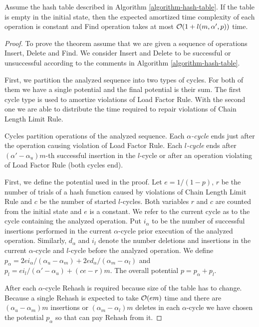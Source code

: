 \begin{theorem}
\label{theorem-amortised-expected-time}
Assume the hash table described in Algorithm \ref{algorithm-hash-table}. 
If the table is empty in the initial state, then the expected amortized time complexity of each operation is constant and Find operation takes at most $\mathcal{O}(1 + l(m, \alpha', p))$ time.
\end{theorem}
\begin{proof}
To prove the theorem assume that we are given a sequence of operations Insert, Delete and Find. 
We consider Insert and Delete to be successful or unsuccessful according to the comments in Algorithm \ref{algorithm-hash-table}.

First, we partition the analyzed sequence into two types of cycles. 
For both of them we have a single potential and the final potential is their sum.
The first cycle type is used to amortize violations of Load Factor Rule. 
With the second one we are able to distribute the time required to repair violations of Chain Length Limit Rule.

\begin{definition}
Cycles partition operations of the analyzed sequence.
Each \emph{$\alpha$-cycle} ends just after the operation causing violation of Load Factor Rule.
Each \emph{$l$-cycle} ends after $(\alpha'-\alpha_u)m$-th successful insertion in the $l$-cycle or after an operation violating of Load Factor Rule (both cycles end).
\end{definition}

First, we define the potential used in the proof.
Let $e = 1/(1 - p)$, $r$ be the number of trials of a hash function caused by violations of Chain Length Limit Rule and $c$ be the number of started $l$-cycles.
Both variables $r$ and $c$ are counted from the initial state and $e$ is a constant.
We refer to the current cycle as to the cycle containing the analyzed operation.
Put $i_\alpha$ to be the number of successful insertions performed in the current $\alpha$-cycle prior execution of the analyzed operation.
Similarly, $d_\alpha$ and $i_l$ denote the number deletions and insertions in the current $\alpha$-cycle and $l$-cycle before the analyzed operation.
We define $p_\alpha = {2ei_{\alpha}}/{(\alpha_u - \alpha_m)} + {2ed_{\alpha}}/{(\alpha_m - \alpha_l)}$ and $p_l = {ei_{l}}/{(\alpha' - \alpha_u)} + (ce - r) m$.
The overall potential $p = p_\alpha + p_l$.

After each $\alpha$-cycle Rehash is required because size of the table has to change.
Because a single Rehash is expected to take $\mathcal{O}(em)$ time and there are $(\alpha_u - \alpha_m)m$ insertions or $(\alpha_m - \alpha_l)m$ deletes in each $\alpha$-cycle we have chosen the potential $p_\alpha$ so that can pay Rehash from it.


\end{proof}
